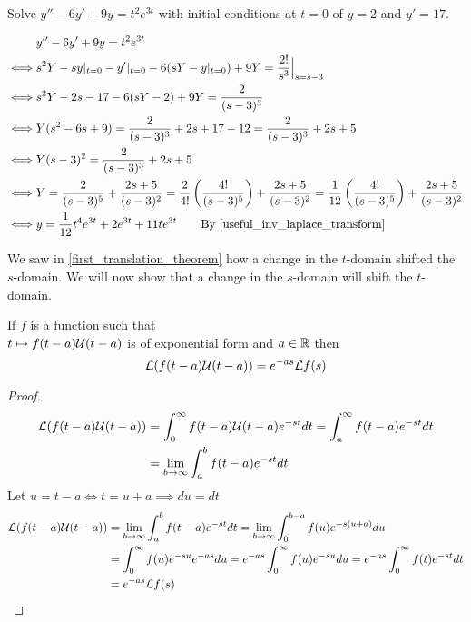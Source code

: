 \documentclass[notes]{subfiles}
\begin{document}
\begin{exercise}
    Solve $y'' - 6y' + 9y = t^2 e^{3t}$ with initial conditions at $t = 0$ of $y = 2$ and $y' = 17$.
\end{exercise}
\begin{solution}
    \begin{align*}
        &y'' - 6y' + 9y = t^2 e^{3t} \\
        \iff& s^2 Y - sy|_{t = 0} - y'|_{t = 0} - 6(sY - y|_{t = 0}) + 9Y = \frac{2!}{s^3}\Big|_{s = s - 3} \\
        \iff& s^2 Y - 2s - 17 - 6(sY - 2) + 9Y = \frac{2}{(s - 3)^3} \\
        \iff& Y(s^2 - 6s + 9) = \frac{2}{(s - 3)^3} + 2s + 17 - 12 = \frac{2}{(s - 3)^3} + 2s + 5 \\
        \iff& Y(s - 3)^2 = \frac{2}{(s - 3)^3} + 2s + 5 \\
        \iff& Y = \frac{2}{(s - 3)^5} + \frac{2s + 5}{(s - 3)^2} = \frac{2}{4!}\left(\frac{4!}{(s - 3)^5}\right) + \frac{2s + 5}{(s - 3)^2} = \frac{1}{12}\left(\frac{4!}{(s - 3)^5}\right) + \frac{2s + 5}{(s - 3)^2} \\
        \iff& y = \frac{1}{12}t^4 e^{3t} + 2e^{3t} + 11t e^{3t} \qquad \text{By \cref{useful_inv_laplace_transform}}
    \end{align*}
\end{solution}

We saw in \cref{first_translation_theorem} how a change in the $t$-domain shifted the $s$-domain. We will now show that a change in the $s$-domain will shift the $t$-domain.
\begin{theorem}
    If $f$ is a function such that \\ $t \mapsto f(t - a)\mathcal{U}(t - a)$ is of exponential form and $a \in \mathbb{R}$ then
    \[
        \mathcal{L}(f(t - a)\mathcal{U}(t - a)) = e^{-as}\mathcal{L} f(s)
    \]
\end{theorem}
\begin{proof}
    \begin{align*}
        \mathcal{L}(f(t - a)\mathcal{U}(t - a))
        &= \int_0^\infty f(t - a)\mathcal{U}(t - a)e^{-st}dt
        = \int_a^\infty f(t - a)e^{-st}dt \\
        &= \lim_{b\to\infty} \int_a^b f(t - a)e^{-st}dt
    \end{align*}
    Let $u = t - a \iff t = u + a \implies du = dt$
    \begin{align*}
        \mathcal{L}(f(t - a)\mathcal{U}(t - a))
        &= \lim_{b\to\infty} \int_a^b f(t - a)e^{-st}dt
        = \lim_{b\to\infty} \int_0^{b - a} f(u)e^{-s(u + a)}du \\
        &= \int_0^\infty f(u)e^{-su}e^{-as}du
        = e^{-as}\int_0^\infty f(u)e^{-su}du
        = e^{-as}\int_0^\infty f(t)e^{-st}dt \\
        &= e^{-as}\mathcal{L} f(s)
    \end{align*}
\end{proof}
\end{document}
